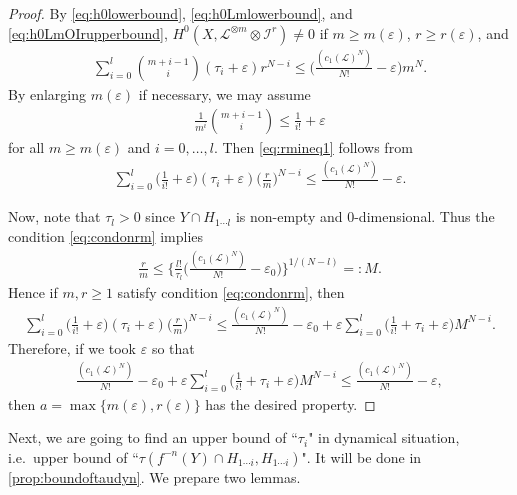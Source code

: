 \documentclass[12pt]{amsart}
\theoremstyle{plain}
\theoremstyle{definition}
\numberwithin{equation}{section}
\def\I{{ \mathcal{I}}}
\def\L{{ \mathcal{L}}}
\newcommand{\e}{\varepsilon}
\begin{document}
\begin{proof}
By \cref{eq:h0lowerbound}, \cref{eq:h0Lmlowerbound}, and \cref{eq:h0LmOIrupperbound}, 
$H^{0}(X, \L^{ \otimes m} \otimes \I^{r}) \neq 0$ if
$m \geq m(\e)$, $r\geq r(\e)$, and
\begin{align}
\sum_{i=0}^{l} \binom{m+i-1}{i}  (\tau_{i} + \e)r^{N-i}  \leq \bigg( \frac{(c_{1}(\L)^{N})}{N!} - \e \bigg) m^{N}. \label{eq:rmineq1}
\end{align}
By enlarging $m(\e)$ if necessary, we may assume 
\begin{align}
\frac{1}{m^{i}}\binom{m+i-1}{i}  \leq \frac{1}{i!} + \e
\end{align}
for all $m \geq m(\e)$ and $i=0,\dots, l$.
Then \cref{eq:rmineq1} follows from
\begin{align}
\sum_{i=0}^{l} \bigg( \frac{1}{i!} + \e \bigg) (\tau_{i} + \e)\bigg( \frac{r}{m}\bigg)^{N-i}  \leq \frac{(c_{1}(\L)^{N})}{N!} - \e .
\end{align}

Now, note that $\tau_{l} > 0$ since $Y \cap H_{1\cdots l}$ is non-empty and $0$-dimensional.
Thus the condition \cref{eq:condonrm} implies 
\begin{align}
\frac{r}{m} \leq \bigg\{ \frac{l!}{\tau_{l}} \bigg( \frac{(c_{1}(\L)^{N})}{N!} - \e_{0}\bigg) \bigg\}^{1/(N-l)} =: M.
\end{align}
Hence if $m,r \geq 1$ satisfy condition \cref{eq:condonrm}, then
\begin{align}
\sum_{i=0}^{l} \bigg( \frac{1}{i!} + \e \bigg) (\tau_{i} + \e)\bigg( \frac{r}{m}\bigg)^{N-i} 
\leq
\frac{ (c_{1}( \mathcal{L})^{N}) }{N!} - \e_{0} + 
\e \sum_{i=0}^{l} \bigg( \frac{1}{i!} + \tau_{i} + \e\bigg)M^{N-i}.
\end{align}
Therefore, if we took $\e$ so that
\begin{align}
\frac{ (c_{1}( \mathcal{L})^{N}) }{N!} - \e_{0} + 
\e \sum_{i=0}^{l} \bigg( \frac{1}{i!} + \tau_{i} + \e\bigg)M^{N-i}
\leq
\frac{(c_{1}(\L)^{N})}{N!} - \e,
\end{align}
then $a = \max\{m(\e), r(\e)\}$ has the desired property.
\end{proof}


Next, we are going to find an upper bound of ``$\tau_{i}$" in dynamical situation, i.e.\ 
upper bound of ``$\tau(f^{-n}(Y)\cap H_{1\cdots i}, H_{1 \cdots i})$".
It will be done in \cref{prop:boundoftaudyn}. We prepare two lemmas.
\end{document}
